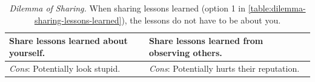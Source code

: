 

\begin{center}
\begin{table}[H] %
\begin{tabular}{ | m{\dilemmatablewidth}| m{\dilemmatablewidth} | } 
  \hline
  \textbf{Share lessons learned about yourself.} & 
  \textbf{Share lessons learned from observing others.} \\ 
  \hline
  \textit{Cons}: Potentially look stupid. & 
  \textit{Cons}: Potentially hurts their reputation. \\  
  \hline
\end{tabular}
\caption{
\textit{Dilemma of Sharing.}
When sharing lessons learned (option 1 in \ref{table:dilemma-sharing-lessons-learned}), the lessons do not have to be about you. 
}
\label{table:dilemma-share-lessons-learned}
\end{table}
\end{center}



